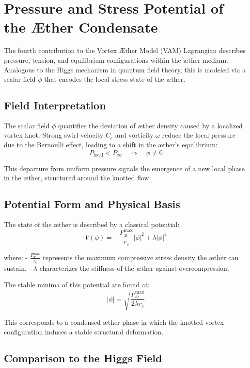 \section{Pressure and Stress Potential of the Æther Condensate}

The fourth contribution to the Vortex Æther Model (VAM) Lagrangian describes pressure, tension, and equilibrium configurations within the æther medium. Analogous to the Higgs mechanism in quantum field theory, this is modeled via a scalar field $\phi$ that encodes the local stress state of the æther.

\subsection*{Field Interpretation}

The scalar field $\phi$ quantifies the deviation of æther density caused by a localized vortex knot. Strong swirl velocity $C_e$ and vorticity $\omega$ reduce the local pressure due to the Bernoulli effect, leading to a shift in the æther's equilibrium:
\[
    P_\text{local} < P_\infty \quad \Rightarrow \quad \phi \neq 0
\]

This departure from uniform pressure signals the emergence of a new local phase in the æther, structured around the knotted flow.

\subsection*{Potential Form and Physical Basis}

The state of the æther is described by a classical potential:
\[
    V(\phi) = -\frac{F^{\text{max}}_{\text{\ae}}}{r_c} |\phi|^2 + \lambda |\phi|^4
\]

where:
- $\frac{F^{\text{max}}_{\text{\ae}}}{r_c}$ represents the maximum compressive stress density the æther can sustain,
- $\lambda$ characterizes the stiffness of the æther against overcompression.

The stable minima of this potential are found at:
\[
    |\phi| = \sqrt{\frac{F^{\text{max}}_{\text{\ae}}}{2\lambda r_c}}
\]

This corresponds to a condensed æther phase in which the knotted vortex configuration induces a stable structural deformation.

\subsection*{Comparison to the Higgs Field}

